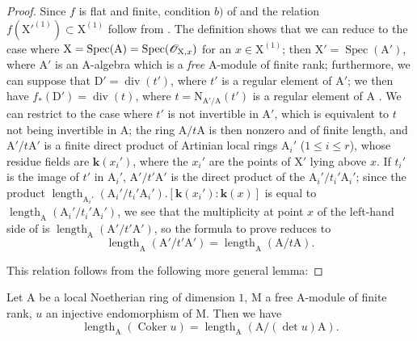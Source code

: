 \begin{proof}
Since $f$ is flat and finite, condition $b)$ of  and the relation $f(\mathrm{X}'^{(1)})\subset\mathrm{X}^{(1)}$ follow from .
The definition  shows that we can reduce to the case where $\mathrm{X}=\operatorname{Spec}(\mathrm{A})=\operatorname{Spec}(\mathscr{O}_{\mathrm{X},x})$ for an $x\in\mathrm{X}^{(1)}$; then $\mathrm{X}'=\operatorname{Spec}(\mathrm{A}')$, where $\mathrm{A}'$ is an $\mathrm{A}$-algebra which is a
\emph{free} $\mathrm{A}$-module of finite rank; furthermore, we can suppose that $\mathrm{D}'=\operatorname{div}(t')$, where $t'$ is a regular element of $\mathrm{A}'$; we then have $f_*(\mathrm{D}')=\operatorname{div}(t)$, where $t=\mathrm{N}_{\mathrm{A}'/\mathrm{A}}(t')$ is a regular element of $\mathrm{A}$ .
We can restrict to the case where $t'$ is not invertible in $\mathrm{A}'$, which is equivalent to $t$ not being invertible in $\mathrm{A}$; the ring $\mathrm{A}/t\mathrm{A}$ is then nonzero and of finite length, and $\mathrm{A}'/t\mathrm{A}'$ is a finite direct product of Artinian local rings $\mathrm{A}_i'$ ($1\leq i\leq r$), whose residue fields are $\boldsymbol{k}(x_i')$, where the $x_i'$ are the points of $\mathrm{X}'$ lying above $x$.
If $t_i'$ is the image of $t'$ in $\mathrm{A}_i'$, $\mathrm{A}'/t'\mathrm{A}'$ is the direct product of the $\mathrm{A}_i'/t_i'\mathrm{A}_i'$; since the product $\operatorname{length}_{\mathrm{A}_i'}(\mathrm{A}_i'/t_i'\mathrm{A}_i').[\boldsymbol{k}(x_i'):\boldsymbol{k}(x)]$ is equal to $\operatorname{length}_{\mathrm{A}}(\mathrm{A}_i'/t_i'\mathrm{A}_i')$, we see that the multiplicity at point $x$ of the left-hand side of  is $\operatorname{length}_{\mathrm{A}}(\mathrm{A}'/t'\mathrm{A}')$, so the formula to prove reduces to
\[
\label{IV.21.10.17.2}
  \operatorname{length}_{\mathrm{A}}(\mathrm{A}'/t'\mathrm{A}')=\operatorname{length}_{\mathrm{A}}(\mathrm{A}/t\mathrm{A}).
  \tag{21.10.17.2}
\]

This relation follows from the following more general lemma:
\end{proof}

\begin{lemma}[21.10.17.3]
\label{IV.21.10.17.3}
Let $\mathrm{A}$ be a local Noetherian ring of dimension $1$, $\mathrm{M}$ a free A-module of finite rank, $u$ an injective endomorphism of $\mathrm{M}$.
Then we have
\[
\label{IV.21.10.17.4}
  \operatorname{length}_{\mathrm{A}}(\operatorname{Coker} u)=\operatorname{length}_{\mathrm{A}}(\mathrm{A}/(\det u)\mathrm{A}).
  \tag{21.10.17.4}
\]
\end{lemma}

